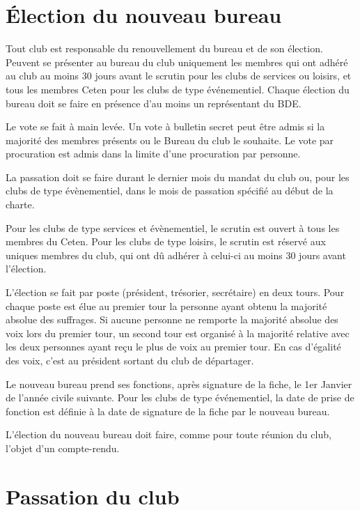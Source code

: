 \documentclass{article}
\begin{document}
\begin{multicols}{2}
		\section{Élection du nouveau bureau}
\label{sec:election_du_nouveau_bureau}

		{\small

			Tout club est responsable du renouvellement du bureau et de son
			élection. Peuvent se présenter au bureau du club uniquement les
			membres qui ont adhéré au club au moins 30 jours avant le scrutin
			pour les clubs de services ou loisirs, et tous les membres Ceten
			pour les clubs de type événementiel. Chaque élection du bureau doit
			se faire en présence d’au moins un représentant du BDE\@.

			Le vote se fait à main levée. Un vote à bulletin secret peut être
			admis si la majorité des membres présents ou le Bureau du club le
			souhaite. Le vote par procuration est admis dans la limite d’une
			procuration par personne.

			La passation doit se faire durant le dernier mois du mandat du club
			ou, pour les clubs de type évènementiel, dans le mois de passation
			spécifié au début de la charte.

			Pour les clubs de type services et évènementiel, le scrutin est
			ouvert à tous les membres du Ceten. Pour les clubs de type loisirs,
			le scrutin est réservé aux uniques membres du club, qui ont dû
			adhérer à celui-ci au moins 30 jours avant l’élection.

			L’élection se fait par poste (président, trésorier, secrétaire) en
			deux tours. Pour chaque poste est élue au premier tour la personne
			ayant obtenu la majorité absolue des suffrages. Si aucune personne
			ne remporte la majorité absolue des voix lors du premier tour, un
			second tour est organisé à la majorité relative avec les deux
			personnes ayant reçu le plus de voix au premier tour. En cas
			d’égalité des voix, c’est au président sortant du club de
			départager.

			Le nouveau bureau prend ses fonctions, après signature de la fiche,
			le 1er Janvier de l’année civile suivante. Pour les clubs de type
			événementiel, la date de prise de fonction est définie à la date de
			signature de la fiche par le nouveau bureau.

			L’élection du nouveau bureau doit faire, comme pour toute réunion du
			club, l’objet d’un compte-rendu.

		}

		\section{Passation du club}
\label{sec:passation_du_club}


\end{multicols}
\end{document}
